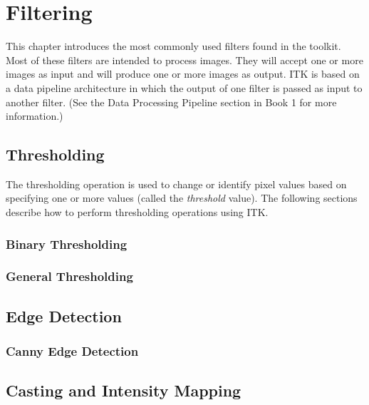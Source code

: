 \chapter{Filtering}

This chapter introduces the most commonly used filters found in the toolkit.
Most of these filters are intended to process images. They will accept one or
more images as input and will produce one or more images as output. ITK is
based on a data pipeline architecture in which the output of one filter is
passed as input to another filter. (See the Data Processing Pipeline section
in Book 1 for more information.)


\section{Thresholding}
\label{sec:ThresholdingFiltering}

The thresholding operation is used to change or identify pixel values based
on specifying one or more values (called the \emph{threshold} value). The
following sections describe how to perform thresholding operations using
ITK.

\subsection{Binary Thresholding}
\label{sec:BinaryThresholdingImageFilter}



\subsection{General Thresholding}
\label{sec:ThresholdingImageFilter}



\section{Edge Detection}

\subsection{Canny Edge Detection}



\section{Casting and Intensity Mapping}
\label{sec:CastingImageFilters}

